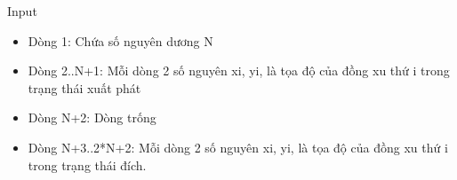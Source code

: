 Input
\begin{itemize}
	\item     Dòng 1: Chứa số nguyên dương N   
	\item     Dòng 2..N+1: Mỗi dòng 2 số nguyên xi, yi, là tọa độ của đồng xu thứ i trong trạng thái xuất phát   
	\item     Dòng N+2: Dòng trống   
	\item     Dòng N+3..2*N+2: Mỗi dòng 2 số nguyên xi, yi, là tọa độ của đồng xu thứ i trong trạng thái đích.   
\end{itemize}